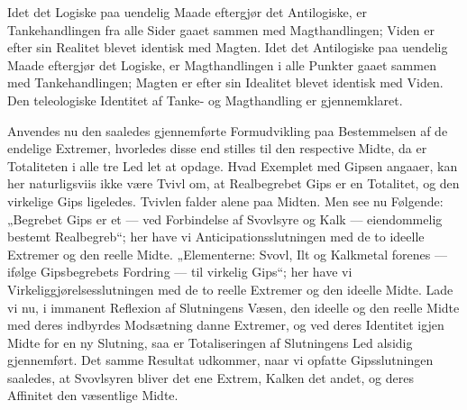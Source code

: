 \documentclass[12pt]{book}
\newcommand{\opage}[1]{\marginnote{\footnotesize\textit{[#1]}}}
\begin{document}
Idet det Logiske paa uendelig Maade eftergjør det Antilogiske, er Tankehandlingen fra alle Sider gaaet sammen med Magthandlingen; Viden er efter sin Realitet blevet identisk med Magten. Idet det Antilogiske paa uendelig Maade eftergjør det Logiske, er Magthandlingen i alle Punkter gaaet sammen med Tankehandlingen; Magten er efter sin Idealitet blevet identisk med Viden. Den teleologiske Identitet af Tanke- og Magthandling er gjennemklaret.

Anvendes nu den saaledes gjennemførte Formudvikling paa Bestemmelsen af de endelige Extremer, hvorledes disse end stilles til den respective Midte, da er Totaliteten i alle tre Led let at opdage. Hvad Exemplet med Gipsen angaaer, kan her naturligsviis ikke være Tvivl om, at Realbegrebet Gips er en Totalitet, og den virkelige Gips ligeledes. Tvivlen falder alene paa Midten. Men see nu Følgende: „Begrebet Gips er et --- ved Forbindelse af Svovlsyre og Kalk --- eiendommelig bestemt Realbegreb“; her have vi Anticipationsslutningen med de to ideelle Extremer og den
\opage{407}reelle Midte. „Elementerne: Svovl, Ilt og Kalkmetal forenes --- ifølge Gipsbegrebets Fordring --- til virkelig Gips“; her have vi Virkeliggjørelsesslutningen med de to reelle Extremer og den ideelle Midte. Lade vi nu, i immanent Reflexion af Slutningens Væsen, den ideelle og den reelle Midte med deres indbyrdes Modsætning danne Extremer, og ved deres Identitet igjen Midte for en ny Slutning, saa er Totaliseringen af Slutningens Led alsidig gjennemført. Det samme Resultat udkommer, naar vi opfatte Gipsslutningen saaledes, at Svovlsyren bliver det ene Extrem, Kalken det andet, og deres Affinitet den væsentlige Midte.
\end{document}
